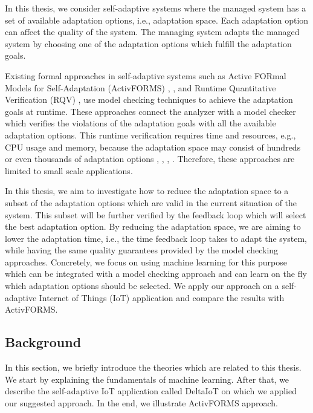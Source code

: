 \documentclass[a4paper,12pt]{article}
\begin{document}
In this thesis, we consider self-adaptive systems where the managed system has a set of available adaptation options, i.e., adaptation space. Each adaptation option can affect the quality of the system. The managing system adapts the managed system by choosing one of the adaptation options which fulfill the adaptation goals.

Existing formal approaches in self-adaptive systems such as Active FORmal Models for Self-Adaptation (ActivFORMS) \cite{AMBATESASWG-2017}, \cite{ACTIVFORMS-2014}, \cite{TRSMCFSAS-2016} and Runtime Quantitative Verification (RQV) \cite{SASNQVAR-2012}, \cite{ETSASWDAC-2017} use model checking techniques to achieve the adaptation goals at runtime. These approaches connect the analyzer with a model checker which verifies the violations of the adaptation goals with all the available adaptation options. This runtime verification requires time and resources, e.g., CPU usage and memory, because the adaptation space may consist of hundreds or even thousands of adaptation options \cite{SEFSASRCITPOA-2017}, \cite{TLFIMPIHCS-2017}, \cite{DQMAOISBS-2011}, \cite{PAFSAS-2017}. Therefore, these approaches are limited to small scale applications.

In this thesis, we aim to investigate how to reduce the adaptation space to a subset of the adaptation options which are valid in the current situation of the system. This subset will be further verified by the feedback loop which will select the best adaptation option. By reducing the adaptation space, we are aiming to lower the adaptation time, i.e., the time feedback loop takes to adapt the system, while having the same quality guarantees provided by the model checking approaches. Concretely, we focus on using machine learning for this purpose which can be integrated with a model checking approach and can learn on the fly which adaptation options should be selected. We apply our approach on a self-adaptive Internet of Things (IoT) application \cite{DELTAIOT-2017} and compare the results with ActivFORMS.
\subsection{Background}
In this section, we briefly introduce the theories which are related to this thesis. We start by explaining the fundamentals of machine learning. After that, we describe the self-adaptive IoT application called DeltaIoT on which we applied our suggested approach. In the end, we illustrate ActivFORMS approach.
\end{document}
